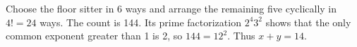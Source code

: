 Choose the floor sitter in 6 ways and arrange the remaining five cyclically in $ 4!=24 $ ways. The count is 144. Its prime factorization $ 2^4 3^2 $ shows that the only common exponent greater than 1 is 2, so $ 144=12^2 $. Thus $\boxed{x+y=14}$.
